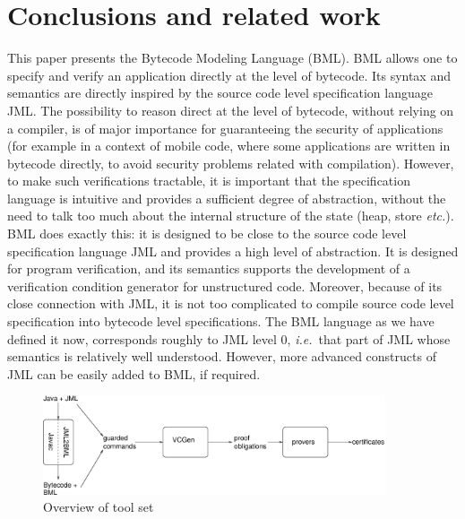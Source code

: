 \section{Conclusions and related work}\label{SecConcl}

This paper presents the Bytecode Modeling Language (BML). BML allows
one to specify and verify an application directly at the level of
bytecode. Its syntax and semantics are directly inspired by the source
code level specification language JML.  The possibility to reason
direct at the level of bytecode, without relying on a compiler, is of
major importance for guaranteeing the security of applications (for
example in a context of mobile code, where some applications are
written in bytecode directly, to avoid security problems related with
compilation). However, to make such verifications tractable, it is
important that the specification language is intuitive and provides a
sufficient degree of abstraction, without the need to talk too much
about the internal structure of the state (heap, store
\emph{etc.}). BML does exactly this: it is designed to be close to the
source code level specification language JML and provides a high level
of abstraction. It is designed for program verification, and its
semantics supports the development of a verification condition
generator for unstructured code. Moreover, because of its close
connection with JML, it is not too complicated to compile source code
level specification into bytecode level specifications.  The BML
language as we have defined it now, corresponds roughly to JML level
0, \emph{i.e.}\ that part of JML whose semantics is relatively well
understood. However, more advanced constructs of JML can be easily
added to BML, if required.

\begin{figure}[t]
\begin{center}
\includegraphics[width=0.9\textwidth]{toolset.eps} 
\caption{Overview of \mobius tool set}\label{FigToolSet}
\end{center}
\end{figure}
